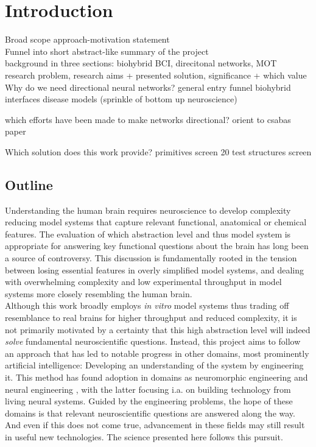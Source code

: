 \section{Introduction}
Broad scope approach-motivation statement \\
Funnel into short abstract-like summary of the project \\
background in three sections: biohybrid BCI, direcitonal networks, MOT \\
research problem, research aims + presented solution,  significance + which value \\


Why do we need directional neural networks?
    general entry funnel
    biohybrid interfaces
    disease models (sprinkle of bottom up neuroscience)

which efforts have been made to make networks directional?
    orient to csabas paper

Which solution does this work provide?
    primitives screen
    20 test structures screen






\newpage
\subsection{Outline}
Understanding the human brain requires neuroscience to develop complexity
reducing model systems that capture relevant functional, anatomical or chemical
features. The evaluation of which abstraction level and thus model system is
appropriate for answering key functional questions about the brain has long been
a source of controversy. This discussion is fundamentally rooted in the tension
between losing essential features in overly simplified model systems, and
dealing with overwhelming complexity and low experimental throughput in model
systems more closely resembling the human brain. \\
Although this work broadly employs \textit{in vitro} model systems thus trading
off resemblance to real brains for higher throughput and reduced complexity, it
is not primarily motivated by a certainty that this high abstraction level will
indeed \textit{solve} fundamental neuroscientific questions. Instead, this
project aims to follow an approach that has led to notable progress in other
domains, most prominently artificial intelligence: Developing an understanding
of the system by engineering it. This method has found adoption in domains as
neuromorphic engineering \parencite{neuromorphic} and neural engineering
\parencite{neuroengineering}, with the latter focusing i.a. on building
technology from living neural systems. Guided by the engineering problems, the
hope of these domains is that relevant neuroscientific questions are answered
along the way. And even if this does not come true, advancement in these fields
may still result in useful new technologies. The science presented here follows
this pursuit.\\ 


